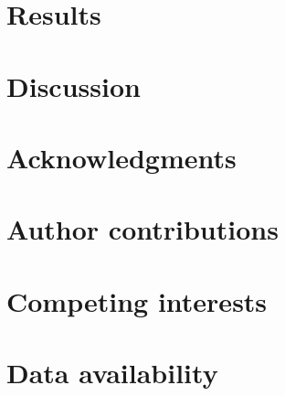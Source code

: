 \documentclass[11pt]{article}
\begin{document}
\section*{Results} 




\section*{Discussion}



\section*{Acknowledgments}  

\section*{Author contributions} 

\section*{Competing interests}


\section*{Data availability}

\newpage



\end{document}
